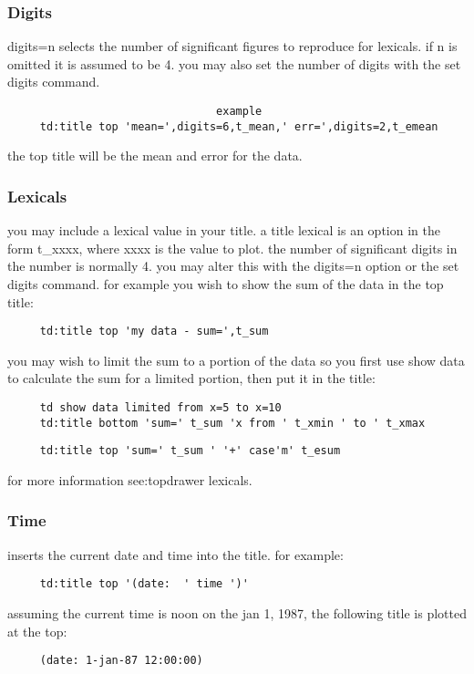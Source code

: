\subsubsection{Digits}
digits=n  selects  the  number  of significant figures to reproduce for
lexicals.  if n is omitted it is assumed to be 4.  you may also set the
number of digits with the set digits command.  

\begin{verbatim}
                                example
     td:title top 'mean=',digits=6,t_mean,' err=',digits=2,t_emean 
\end{verbatim}
the top title will be the mean and error for the data.  
\subsubsection{Lexicals}
you  may  include a lexical value in your title.  a title lexical is an
option in the form t\_xxxx, where xxxx is the value to plot.  the number
of  significant digits in the number is normally 4.  you may alter this
with the digits=n option or the set digits command.   for  example  you
wish to show the sum of the data in the top title:  
\begin{verbatim}
     td:title top 'my data - sum=',t_sum 
\end{verbatim}
you may wish to limit the sum to a portion of the data so you first use
show data to calculate the sum for a limited portion, then  put  it  in
the title:  
\begin{verbatim}
     td show data limited from x=5 to x=10 
     td:title bottom 'sum=' t_sum 'x from ' t_xmin ' to ' t_xmax 
\end{verbatim}

\begin{verbatim}
     td:title top 'sum=' t_sum ' '+' case'm' t_esum 
\end{verbatim}
for more information see:topdrawer lexicals.  
\subsubsection{Time}
inserts the current date and time into the title.  for example:  
\begin{verbatim}
     td:title top '(date:  ' time ')' 
\end{verbatim}
assuming  the  current  time  is noon on the jan 1, 1987, the following
title is plotted at the top:  
\begin{verbatim}
     (date: 1-jan-87 12:00:00) 
\end{verbatim}
